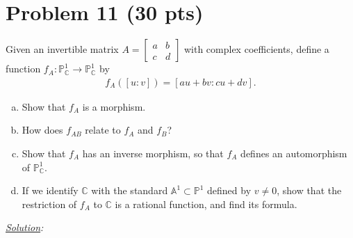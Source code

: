 \documentclass[12pt]{article}
\newcommand{\A}{\mathbb{A}}
\begin{document}
\section*{Problem 11 \small{(30 pts)}}
Given an invertible matrix $A = \begin{bmatrix}
a&b\\c&d
\end{bmatrix}$ with complex coefficients, define a function $f_A : \mathbb{P}^1_{\mathbb{C}} \to \mathbb{P}^1_{\mathbb{C}}$ by
\begin{align*}
f_A ([u:v]) = [au + bv : cu + dv].
\end{align*}
\begin{enumerate}[(a)]
	\item Show that $f_A$ is a morphism. 

	\item How does $f_{AB}$ relate to $f_A$ and $f_B$? 
	
	\item Show that $f_A$ has an inverse morphism, so that $f_A$ defines an automorphism of $\mathbb{P}^1_{\mathbb{C}}$. 
	
	 
	\item If we identify $\mathbb{C}$ with the standard $\A^1 \subset \mathbb{P}^1$ defined by $v\neq 0$, show that the restriction of $f_A$ to $\mathbb{C}$ is a rational function, and find its formula.  
\end{enumerate}


\noindent \textit{\underline{Solution}:}
\end{document}
